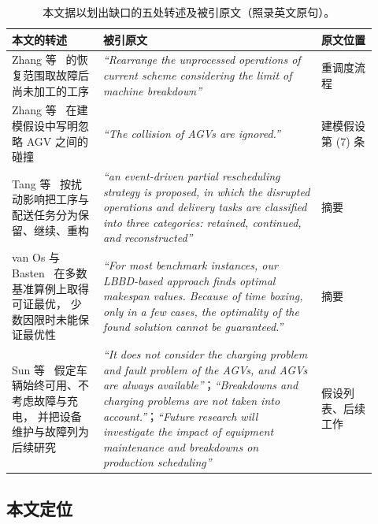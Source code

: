 \begin{table}[t]
\centering
\caption{本文据以划出缺口的五处转述及被引原文（照录英文原句）。}
\label{tab:refcheck}
\footnotesize
\begin{tabular}{@{}p{0.23\linewidth}p{0.55\linewidth}p{0.14\linewidth}@{}}
\toprule
\textbf{本文的转述} & \textbf{被引原文} & \textbf{原文位置} \\
\midrule
Zhang 等~\cite{zhang2023energy} 的恢复范围取故障后尚未加工的工序 &
\emph{``Rearrange the unprocessed operations of current scheme considering the limit of
machine breakdown''} &
重调度流程 \\
\addlinespace
Zhang 等~\cite{zhang2023energy} 在建模假设中写明忽略 AGV 之间的碰撞 &
\emph{``The collision of AGVs are ignored.''} &
建模假设第 (7) 条 \\
\addlinespace
Tang 等~\cite{tang2026dynamic} 按扰动影响把工序与配送任务分为保留、继续、重构 &
\emph{``an event-driven partial rescheduling strategy is proposed, in which the disrupted
operations and delivery tasks are classified into three categories: retained, continued,
and reconstructed''} &
摘要 \\
\addlinespace
van Os 与 Basten~\cite{vanos2026exact} 在多数基准算例上取得可证最优，
少数因限时未能保证最优性 &
\emph{``For most benchmark instances, our LBBD-based approach finds optimal makespan
values. Because of time boxing, only in a few cases, the optimality of the found solution
cannot be guaranteed.''} &
摘要 \\
\addlinespace
Sun 等~\cite{sun2023integrated} 假定车辆始终可用、不考虑故障与充电，
并把设备维护与故障列为后续研究 &
\emph{``It does not consider the charging problem and fault problem of the AGVs, and AGVs
are always available''}；\emph{``Breakdowns and charging problems are not taken into
account.''}；\emph{``Future research will investigate the impact of equipment maintenance
and breakdowns on production scheduling''} &
假设列表、后续工作 \\
\bottomrule
\end{tabular}
\end{table}

\subsection{本文定位}
\label{sec:rw_claim}

